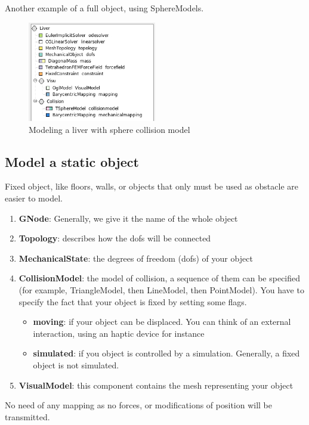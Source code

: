 Another example of a full object, using SphereModels.
\begin{figure}[htpb]
	\centering
		\includegraphics[width=0.5\textwidth]{Modelling3.jpg}
	\caption{Modeling a liver with sphere collision model}
\end{figure}

\subsection{Model a static object}
Fixed object, like floors, walls, or objects that only must be used as obstacle are easier to model. 

\begin{enumerate}
 \item { \bf GNode}: Generally, we give it the name of the whole object
 \item { \bf Topology}: describes how the dofs will be connected
 \item { \bf MechanicalState}: the degrees of freedom (dofs) of your object
 \item { \bf CollisionModel}: the model of collision, a sequence of them can be specified (for example, TriangleModel, then LineModel, then PointModel). You have to specify the fact that your object is fixed by setting some flags.
\begin{itemize}
 \item { \bf moving}: if your object can be displaced. You can think of an external interaction, using an haptic device for instance
 \item { \bf simulated}: if you object is controlled by a simulation. Generally, a fixed object is not simulated.
\end{itemize}
 \item { \bf VisualModel}: this component contains the mesh representing your object
\end{enumerate}
No need of any mapping as no forces, or modifications of position will be transmitted.

